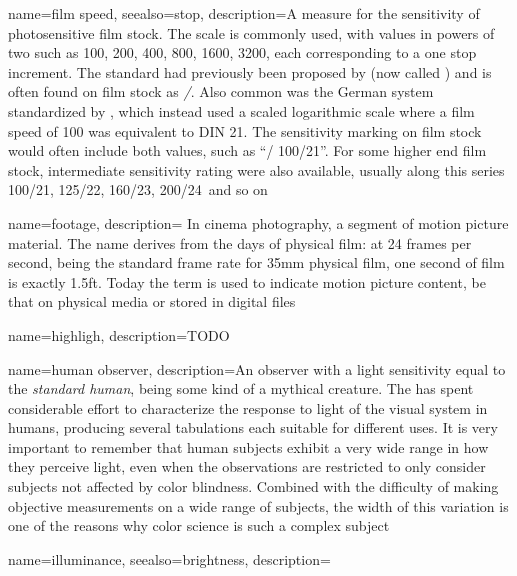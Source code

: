 {
	name={film speed},
	seealso={stop},
	description={A measure for the sensitivity of photosensitive film stock. 
		The  scale is commonly used, with values in powers of two such 
		as 100, 200, 400, 800, 1600, 3200, each corresponding to a one stop increment. 
		The standard had previously been proposed by 
		(now called ) and is often found on film stock as 
		\textsl{/}. 
		Also common was the German system standardized by , which instead 
		used a scaled logarithmic scale where a film speed of  100 was equivalent 
		to DIN 21\degree. 
		The sensitivity marking on film stock would often include both values, 
		such as ``/ 100/21\degree''. 
		For some higher end film stock, intermediate
		sensitivity rating were also available, usually along this series
		100/21\degree, 125/22\degree, 160/23\degree, 200/24\degree\ and so on}
}

{
	name=footage,
	description={
		In cinema photography, a segment of motion picture material. The name derives from
	    the days of physical film: at 24 frames per second, being the standard frame rate for
    	35\unit{\milli\meter} physical film, one second of film is exactly 1.5ft.
    	Today the term is used to indicate motion picture content, be that on physical
        media or stored in digital files}
}

{
	name=highligh,
	description={TODO}
}

{    
	name={human observer},
	description={An observer with a light sensitivity equal to the \textsl{standard human},
		being some kind of a mythical creature.
		The  has spent considerable effort to characterize the response to light 
		of the visual system in humans, producing several tabulations each suitable for
		different uses. 
		It is very important to remember that human subjects exhibit a very wide range 
		in how they perceive light, even when the observations are restricted to only 
		consider subjects not affected by color blindness.
		Combined with the difficulty of making objective measurements on a wide range 
		of subjects, the width of this variation is one of the reasons why color science is
		such a complex subject}
}

{
	name=illuminance,
	seealso={brightness},
	description=\nopostdesc
}

